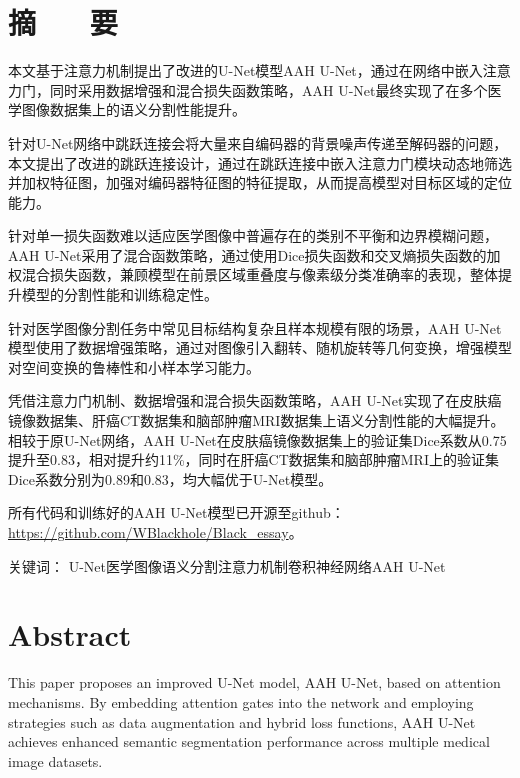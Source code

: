 \section*{ \centering 摘 ~~ 要}

\vskip0.5cm

本文基于注意力机制提出了改进的U-Net模型AAH U-Net，通过在网络中嵌入注意力门，同时采用数据增强和混合损失函数策略，AAH U-Net最终实现了在多个医学图像数据集上的语义分割性能提升。

针对U-Net网络中跳跃连接会将大量来自编码器的背景噪声传递至解码器的问题，本文提出了改进的跳跃连接设计，通过在跳跃连接中嵌入注意力门模块动态地筛选并加权特征图，加强对编码器特征图的特征提取，从而提高模型对目标区域的定位能力。

针对单一损失函数难以适应医学图像中普遍存在的类别不平衡和边界模糊问题，AAH U-Net采用了混合函数策略，通过使用Dice损失函数和交叉熵损失函数的加权混合损失函数，兼顾模型在前景区域重叠度与像素级分类准确率的表现，整体提升模型的分割性能和训练稳定性。

针对医学图像分割任务中常见目标结构复杂且样本规模有限的场景，AAH U-Net模型使用了数据增强策略，通过对图像引入翻转、随机旋转等几何变换，增强模型对空间变换的鲁棒性和小样本学习能力。

凭借注意力门机制、数据增强和混合损失函数策略，AAH U-Net实现了在皮肤癌镜像数据集、肝癌CT数据集和脑部肿瘤MRI数据集上语义分割性能的大幅提升。相较于原U-Net网络，AAH U-Net在皮肤癌镜像数据集上的验证集Dice系数从0.75提升至0.83，相对提升约11\%，同时在肝癌CT数据集和脑部肿瘤MRI上的验证集Dice系数分别为0.89和0.83，均大幅优于U-Net模型。

所有代码和训练好的AAH U-Net模型已开源至github：\url{https://github.com/WBlackhole/Black_essay}。

{ \heiti 关键词：} U-Net\quad 医学图像语义分割\quad 注意力机制\quad 卷积神经网络\quad AAH U-Net

\vskip0.5cm


\clearpage
\section*{ \centering \textbf{Abstract} }

This paper proposes an improved U-Net model, AAH U-Net, based on attention mechanisms. By embedding attention gates into the network and employing strategies such as data augmentation and hybrid loss functions, AAH U-Net achieves enhanced semantic segmentation performance across multiple medical image datasets.

